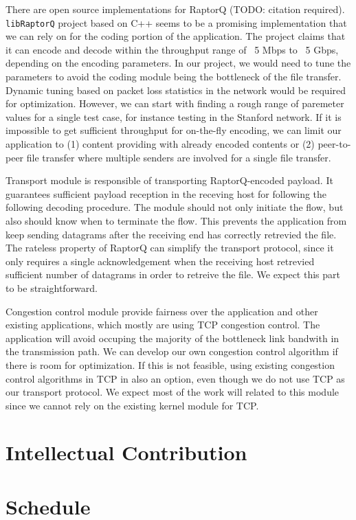 \documentclass{sig-alternate-10pt}
\begin{document}
There are open source implementations for RaptorQ (TODO: citation required).
\texttt{libRaptorQ} project based on C++ seems to be a promising implementation
that we can rely on for the coding portion of the application. The project
claims that it can encode and decode within the throughput range of ~5 Mbps to
~5 Gbps, depending on the encoding parameters. In our project, we would need to
tune the parameters to avoid the coding module being the bottleneck of the file
transfer.  Dynamic tuning based on packet loss statistics in the network would
be required for optimization. However, we can start with finding a rough range
of paremeter values for a single test case, for instance testing in the Stanford
network. If it is impossible to get sufficient throughput for on-the-fly
encoding, we can limit our application to (1) content providing with already
encoded contents or (2) peer-to-peer file transfer where multiple senders are
involved for a single file transfer.

Transport module is responsible of transporting RaptorQ-encoded payload. It
guarantees sufficient payload reception in the receving host for following the
following decoding procedure. The module should not only initiate the flow, but
also should know when to terminate the flow. This prevents the application from
keep sending datagrams after the receiving end has correctly retrevied the file.
The rateless property of RaptorQ can simplify the transport protocol, since it
only requires a single acknowledgement when the receiving host retrevied
sufficient number of datagrams in order to retreive the file. We expect this
part to be straightforward.

Congestion control module provide fairness over the application and other
existing applications, which mostly are using TCP congestion control. The
application will avoid occuping the majority of the bottleneck link bandwith in
the transmission path. We can develop our own congestion control algorithm if
there is room for optimization. If this is not feasible, using existing
congestion control algorithms in TCP in also an option, even though we do not
use TCP as our transport protocol. We expect most of the work will related to
this module since we cannot rely on the existing kernel module for TCP.

\section{Intellectual Contribution}

\section{Schedule}
\end{document}
